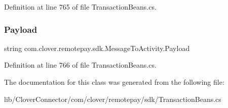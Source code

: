 Definition at line 765 of file Transaction\+Beans.\+cs.

\mbox{\label{classcom_1_1clover_1_1remotepay_1_1sdk_1_1_message_to_activity_adb7eb4d199d215741e2184b04ec5e08e}} 
\subsubsection{\texorpdfstring{Payload}{Payload}}
{\footnotesize\ttfamily string com.\+clover.\+remotepay.\+sdk.\+Message\+To\+Activity.\+Payload}



Definition at line 766 of file Transaction\+Beans.\+cs.



The documentation for this class was generated from the following file\+:\begin{DoxyCompactItemize}
\item 
lib/\+Clover\+Connector/com/clover/remotepay/sdk/Transaction\+Beans.\+cs\end{DoxyCompactItemize}
